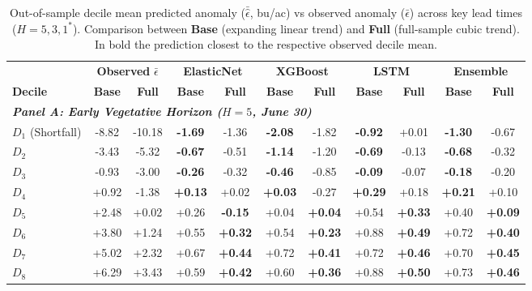 \begin{table}[htbp]
\centering
\singlespacing
\scriptsize
\setlength{\tabcolsep}{3.0pt}
\renewcommand{\arraystretch}{0.96}
\caption{Out-of-sample decile mean predicted anomaly ($\bar{\hat{\epsilon}}$, bu/ac) vs observed anomaly ($\bar{\epsilon}$) across key lead times ($H = 5, 3, 1^*$). Comparison between \textbf{Base} (expanding linear trend) and \textbf{Full} (full-sample cubic trend). In bold the prediction closest to the respective observed decile mean.}
\label{tab:appendix_decile_error_performance}
\begin{tabular*}{\textwidth}{@{\extracolsep{\fill}} l cc cc cc cc cc @{}}
\toprule
& \multicolumn{2}{c}{\textbf{Observed } $\bar{\epsilon}$} & \multicolumn{2}{c}{\textbf{ElasticNet}} & \multicolumn{2}{c}{\textbf{XGBoost}} & \multicolumn{2}{c}{\textbf{LSTM}} & \multicolumn{2}{c}{\textbf{Ensemble}} \\
\cmidrule(lr){2-3}\cmidrule(lr){4-5}\cmidrule(lr){6-7}\cmidrule(lr){8-9}\cmidrule(lr){10-11}
\textbf{Decile} & \textbf{Base} & \textbf{Full} & \textbf{Base} & \textbf{Full} & \textbf{Base} & \textbf{Full} & \textbf{Base} & \textbf{Full} & \textbf{Base} & \textbf{Full} \\
\midrule
\multicolumn{11}{l}{\textit{\textbf{Panel A: Early Vegetative Horizon ($H = 5$, June 30)}}} \\
\midrule
$D_{1}$ (Shortfall) & -8.82 & -10.18 & \textbf{-1.69} & -1.36 & \textbf{-2.08} & -1.82 & \textbf{-0.92} & +0.01 & \textbf{-1.30} & -0.67 \\
$D_{2}$ & -3.43 & -5.32 & \textbf{-0.67} & -0.51 & \textbf{-1.14} & -1.20 & \textbf{-0.69} & -0.13 & \textbf{-0.68} & -0.32 \\
$D_{3}$ & -0.93 & -3.00 & \textbf{-0.26} & -0.32 & \textbf{-0.46} & -0.85 & \textbf{-0.09} & -0.07 & \textbf{-0.18} & -0.20 \\
$D_{4}$ & +0.92 & -1.38 & \textbf{+0.13} & +0.02 & \textbf{+0.03} & -0.27 & \textbf{+0.29} & +0.18 & \textbf{+0.21} & +0.10 \\
$D_{5}$ & +2.48 & +0.02 & +0.26 & \textbf{-0.15} & +0.04 & \textbf{+0.04} & +0.54 & \textbf{+0.33} & +0.40 & \textbf{+0.09} \\
$D_{6}$ & +3.80 & +1.24 & +0.55 & \textbf{+0.32} & +0.54 & \textbf{+0.23} & +0.88 & \textbf{+0.49} & +0.72 & \textbf{+0.40} \\
$D_{7}$ & +5.02 & +2.32 & +0.67 & \textbf{+0.44} & +0.72 & \textbf{+0.41} & +0.72 & \textbf{+0.46} & +0.70 & \textbf{+0.45} \\
$D_{8}$ & +6.29 & +3.43 & +0.59 & \textbf{+0.42} & +0.60 & \textbf{+0.36} & +0.88 & \textbf{+0.50} & +0.73 & \textbf{+0.46} \\

\end{tabular*}
\end{table}

